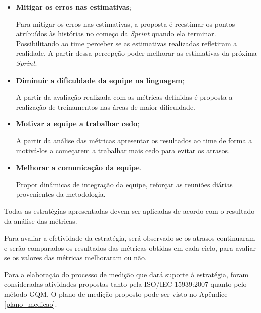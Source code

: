 		\begin{itemize}

		  \item \textbf{Mitigar os erros nas estimativas};
		    
		    \subitem Para mitigar os erros nas estimativas, a proposta é reestimar os pontos atribuídos às histórias
			      no começo da \textit{Sprint} quando ela terminar. Possibilitando ao time perceber
			      se as estimativas realizadas refletiram a realidade. A partir dessa percepção poder
			      melhorar as estimativas da próxima \textit{Sprint}.
		    
		  \item \textbf{Diminuir a dificuldade da equipe na linguagem};
		    
		    \subitem A partir da avaliação realizada com as métricas definidas é proposta a realização de
			      treinamentos nas áreas de maior dificuldade.
		    
		  \item \textbf{Motivar a equipe a trabalhar cedo};
		  
		    \subitem A partir da análise das métricas apresentar os resultados ao time de forma a
			      motivá-los a começarem a trabalhar mais cedo para evitar os atrasos.
		    
		  \item \textbf{Melhorar a comunicação da equipe}.
		    
		    \subitem Propor dinâmicas de integração da equipe, reforçar as reuniões diárias
			      provenientes da metodologia.
	      
		\end{itemize}
		
		Todas as estratégias apresentadas devem ser aplicadas de acordo com o resultado da análise das métricas.


		Para avaliar a efetividade da estratégia, será observado se os atrasos continuaram e 
		serão comparados os resultados das métricas obtidas em cada ciclo, para avaliar se os valores
		das métricas melhoraram ou não.

	    
		Para a elaboração do processo de medição que dará suporte à estratégia, foram consideradas atividades
		propostas tanto pela ISO/IEC 15939:2007 quanto pelo método GQM.
		O plano de medição proposto pode ser visto no Apêndice \ref{plano_medicao}.

